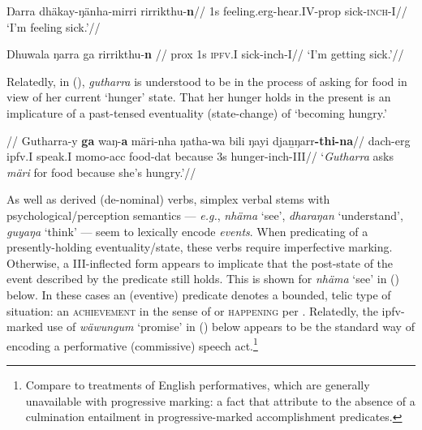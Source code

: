 \a\begingl\gla Ŋarra dhäkay-ŋänha-mirri rirrikthu-\textbf{n}//
\glb 1s feeling.\gls{erg}-hear.\gls{IV}-\gls{prop} sick-\textsc{inch}-\gls{I}//
\glft`I'm feeling sick.'\trailingcitation[DB~20190405]//\endgl


\a\begingl\gla Dhuwala ŋarra ga rirrikthu-\textbf{n}
 //
\glb  \gls{prox} 1s \textsc{ipfv.\gls{I}} sick-\gls{inch}-\gls{I}//
\glft`I'm getting sick.'\trailingcitation[DB~20190405]//\endgl

\xe

Relatedly, in (), \textit{gutharra} is understood to be in the process of asking for food in view of her current `hunger' state. That her hunger holds in the present is an implicature of a past-tensed eventuality (state-change) of `becoming hungry.'

\ex\begingl\glpreamble{}//
\gla Gutharra-y \textbf{ga} waŋ-\textbf{a} märi-nha ŋatha-wa bili ŋayi djaṉŋarr\textbf{-thi-na}//
\glb \gls{da}\gls{ch}-\gls{erg} \gls{ipfv}.\gls{I} speak.\gls{I} \gls{mo}\gls{mo}-\gls{acc} food-\gls{dat} because 3s hunger-\gls{inch}-\gls{III}//
\glft`\textit{Gutharra} asks \textit{märi} for food because she's hungry.'\trailingcitation{[WG~20171208]\footnotemark}//\endgl\xe
{}


As well as derived (de-nominal) verbs, simplex verbal stems with psychological\slash{}perception semantics --- \textit{e.g.}, \textit{nhäma} `see', \textit{dharaŋan} `understand', \textit{guyaŋa} `think' --- seem to lexically encode \textit{events}. When predicating of a presently-holding eventuality/state, these verbs require imperfective marking. Otherwise, a \gls{III}-inflected form appears to implicate that the post-state of the event described by the predicate still holds. This is shown for \textit{nhäma} `see' in (\nextx) below. In these cases an (eventive) predicate denotes a bounded, telic type of situation: an \textsc{achievement} in the sense of \citet{Vendler1957} or \textsc{happening} per \citet{Bach1986}. Relatedly, the \gls{ipfv}-marked use of \textit{wäwungum} `promise' in () below appears to be the standard way of encoding a performative (commissive) speech act.\footnote{Compare to treatments of English performatives, which are generally unavailable with progressive marking: a fact that \citet{Condoravdi2011} attribute to the absence of a culmination entailment in progressive-marked accomplishment predicates.} %

